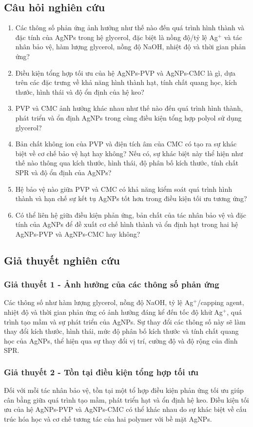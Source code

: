 \subsection{Câu hỏi nghiên cứu}
\begin{enumerate}
  \item Các thông số phản ứng ảnh hưởng như thế nào đến quá trình hình thành và đặc tính của AgNPs trong hệ glycerol, đặc biệt là nồng độ/tỷ lệ Ag$^+$ và tác nhân bảo vệ, hàm lượng glycerol, nồng độ NaOH, nhiệt độ và thời gian phản ứng?
  \item Điều kiện tổng hợp tối ưu của hệ AgNPs-PVP và AgNPs-CMC là gì, dựa trên các đặc trưng về khả năng hình thành hạt, tính chất quang học, kích thước, hình thái và độ ổn định của hệ keo?
  \item PVP và CMC ảnh hưởng khác nhau như thế nào đến quá trình hình thành, phát triển và ổn định AgNPs trong cùng điều kiện tổng hợp polyol sử dụng glycerol?
  \item Bản chất không ion của PVP và điện tích âm của CMC có tạo ra sự khác biệt về cơ chế bảo vệ hạt hay không? Nếu có, sự khác biệt này thể hiện như thế nào thông qua kích thước, hình thái, độ phân bố kích thước, tính chất SPR và độ ổn định của AgNPs?
  \item Hệ bảo vệ nào giữa PVP và CMC có khả năng kiểm soát quá trình hình thành và hạn chế sự kết tụ AgNPs tốt hơn trong điều kiện tối ưu tương ứng?
  \item Có thể liên hệ giữa điều kiện phản ứng, bản chất của tác nhân bảo vệ và đặc tính của AgNPs để đề xuất cơ chế hình thành và ổn định hạt trong hai hệ AgNPs-PVP và AgNPs-CMC hay không?
\end{enumerate}

\subsection{Giả thuyết nghiên cứu}
\subsubsection{Giả thuyết 1 - Ảnh hưởng của các thông số phản ứng}
Các thông số như hàm lượng glycerol, nồng độ NaOH, tỷ lệ Ag$^+$/capping agent, nhiệt độ và thời gian phản ứng có ảnh hưởng đáng kể đến tốc độ khử Ag$^+$, quá trình tạo mầm và sự phát triển của AgNPs.
Sự thay đổi các thông số này sẽ làm thay đổi kích thước, hình thái, mức độ phân bố kích thước và tính chất quang học của AgNPs, thể hiện qua sự thay đổi vị trí, cường độ và độ rộng của đỉnh SPR.
\subsubsection{Giả thuyết 2 - Tồn tại điều kiện tổng hợp tối ưu}
Đối với mỗi tác nhân bảo vệ, tồn tại một tổ hợp điều kiện phản ứng tối ưu giúp cân bằng giữa quá trình tạo mầm, phát triển hạt và ổn định hệ keo.
Điều kiện tối ưu của hệ AgNPs-PVP và AgNPs-CMC có thể khác nhau do sự khác biệt về cấu trúc hóa học và cơ chế tương tác của hai polymer với bề mặt AgNPs.
